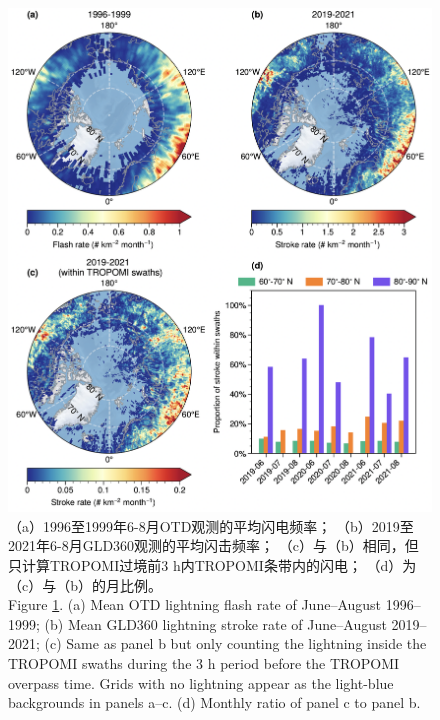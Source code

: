 \begin{figure}[!htbp]
\centering
\includegraphics[width=13cm]{./figures/arctic_lightning_distribution.png}
\caption{
（a）1996至1999年6-8月OTD观测的平均闪电频率；
（b）2019至2021年6-8月GLD360观测的平均闪击频率；
（c）与（b）相同，但只计算TROPOMI过境前3 h内TROPOMI条带内的闪电；
（d）为（c）与（b）的月比例。\\
Figure \ref{fig:arctic_lightning_distribution}.
(a) Mean OTD lightning flash rate of June--August 1996--1999;
(b) Mean GLD360 lightning stroke rate of June--August 2019--2021;
(c) Same as panel b but only counting the lightning inside the TROPOMI swaths during the 3 h period before the TROPOMI overpass time.
Grids with no lightning appear as the light-blue backgrounds in panels a--c.
(d) Monthly ratio of panel c to panel b.
}
\label{fig:arctic_lightning_distribution}
\end{figure}

